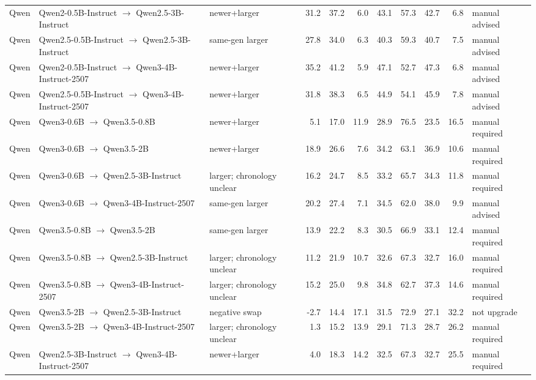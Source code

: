\begin{tabular}{lllrrrrrrrl}
Qwen & Qwen2-0.5B-Instruct $\rightarrow$ Qwen2.5-3B-Instruct & newer+larger & 31.2 & 37.2 & 6.0 & 43.1 & 57.3 & 42.7 & 6.8 & manual advised \\
Qwen & Qwen2.5-0.5B-Instruct $\rightarrow$ Qwen2.5-3B-Instruct & same-gen larger & 27.8 & 34.0 & 6.3 & 40.3 & 59.3 & 40.7 & 7.5 & manual advised \\
Qwen & Qwen2-0.5B-Instruct $\rightarrow$ Qwen3-4B-Instruct-2507 & newer+larger & 35.2 & 41.2 & 5.9 & 47.1 & 52.7 & 47.3 & 6.8 & manual advised \\
Qwen & Qwen2.5-0.5B-Instruct $\rightarrow$ Qwen3-4B-Instruct-2507 & newer+larger & 31.8 & 38.3 & 6.5 & 44.9 & 54.1 & 45.9 & 7.8 & manual advised \\
Qwen & Qwen3-0.6B $\rightarrow$ Qwen3.5-0.8B & newer+larger & 5.1 & 17.0 & 11.9 & 28.9 & 76.5 & 23.5 & 16.5 & manual required \\
Qwen & Qwen3-0.6B $\rightarrow$ Qwen3.5-2B & newer+larger & 18.9 & 26.6 & 7.6 & 34.2 & 63.1 & 36.9 & 10.6 & manual required \\
Qwen & Qwen3-0.6B $\rightarrow$ Qwen2.5-3B-Instruct & larger; chronology unclear & 16.2 & 24.7 & 8.5 & 33.2 & 65.7 & 34.3 & 11.8 & manual required \\
Qwen & Qwen3-0.6B $\rightarrow$ Qwen3-4B-Instruct-2507 & same-gen larger & 20.2 & 27.4 & 7.1 & 34.5 & 62.0 & 38.0 & 9.9 & manual advised \\
Qwen & Qwen3.5-0.8B $\rightarrow$ Qwen3.5-2B & same-gen larger & 13.9 & 22.2 & 8.3 & 30.5 & 66.9 & 33.1 & 12.4 & manual required \\
Qwen & Qwen3.5-0.8B $\rightarrow$ Qwen2.5-3B-Instruct & larger; chronology unclear & 11.2 & 21.9 & 10.7 & 32.6 & 67.3 & 32.7 & 16.0 & manual required \\
Qwen & Qwen3.5-0.8B $\rightarrow$ Qwen3-4B-Instruct-2507 & larger; chronology unclear & 15.2 & 25.0 & 9.8 & 34.8 & 62.7 & 37.3 & 14.6 & manual required \\
Qwen & Qwen3.5-2B $\rightarrow$ Qwen2.5-3B-Instruct & negative swap & -2.7 & 14.4 & 17.1 & 31.5 & 72.9 & 27.1 & 32.2 & not upgrade \\
Qwen & Qwen3.5-2B $\rightarrow$ Qwen3-4B-Instruct-2507 & larger; chronology unclear & 1.3 & 15.2 & 13.9 & 29.1 & 71.3 & 28.7 & 26.2 & manual required \\
Qwen & Qwen2.5-3B-Instruct $\rightarrow$ Qwen3-4B-Instruct-2507 & newer+larger & 4.0 & 18.3 & 14.2 & 32.5 & 67.3 & 32.7 & 25.5 & manual required \\
\bottomrule
\end{tabular}
